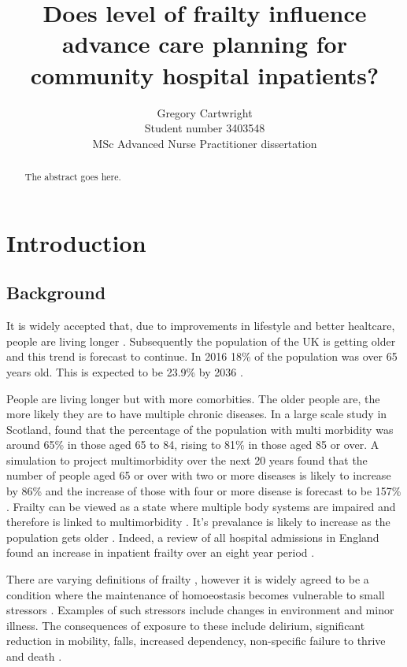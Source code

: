 \documentclass
[
	12pt,
	a4paper,
	oneside,
]{article}
\begin{document}
\author{Gregory Cartwright\\
	Student number 3403548\\
	MSc Advanced Nurse Practitioner dissertation
}
\title{Does level of frailty influence advance care planning 
	for community hospital inpatients?
}

\maketitle

\begin{abstract}
The abstract goes here.
\end{abstract}

\section{Introduction}

\subsection{Background}

It is widely accepted that, due to improvements in lifestyle and better healtcare, 
people are living longer \parencite{nao:08,ons:17}. Subsequently the population of 
the UK is getting older and this trend is forecast to continue.
In 2016 18\% of the population was over 65 years old. This is expected to be
23.9\% by 2036 \parencite{ons:17}.


People are living longer but with more comorbities. The older people are, the more
likely they are to have multiple chronic diseases. In a large scale study in
Scotland, \textcite{barnett:12} found that the percentage of the population with multi morbidity was around 
65\% in those aged 65 to 84, rising to 81\% in those aged 85 or over. A simulation 
to project multimorbidity over the next 20 years found that the number of people
aged 65 or over with two or more diseases is likely to increase by 86\% and the
increase of those with four or more disease is forecast to be 157\%
\parencite{kingston:18}. Frailty can be viewed as a state where multiple body 
systems are impaired and therefore is linked to multimorbidity
\parencite{woo:14}. It's prevalance is likely to increase as the population
gets older \parencite{sharp:13}. Indeed, a review of all hospital admissions in 
England found an increase in inpatient frailty over an eight year period 
\parencite{soong:15}.

There are varying definitions of frailty \parencite{soong:15}, however it is 
widely agreed to be a condition where the maintenance of homoeostasis 
becomes vulnerable to  small stressors \parencite{vellas:16}. Examples of such 
stressors include changes in environment and minor illness. The consequences of 
exposure to these include delirium, significant reduction in mobility,
falls, increased dependency, non-specific failure to thrive and death 
\parencite{bgs:14,oliver:14,vellas:16}.
\end{document}
